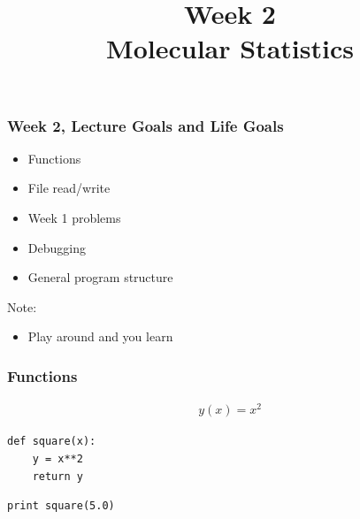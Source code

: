 

\usepackage{soul}

\title[]{Week 2\\Molecular Statistics}








{
\usebackgroundtemplate{}
\begin{frame}[plain]
    \titlepage
    \addtocounter{framenumber}{-1}
\end{frame}
}

\begin{frame}[fragile]

    \frametitle{Week 2, Lecture Goals and Life Goals}

    \begin{itemize}
        \item Functions
        \item File read/write
        \item Week 1 problems
        \item Debugging
        \item General program structure
    \end{itemize}

    \bigskip

    Note:
    \begin{itemize}

        \item Play around and you learn

    \end{itemize}

\end{frame}


\begin{frame}[fragile]

    \frametitle{Functions}

    \begin{align*}
        y(x) = x^2
    \end{align*}

    \bigskip
    \bigskip

\begin{lstlisting}
def square(x):
    y = x**2
    return y

\end{lstlisting}

\begin{lstlisting}
print square(5.0)

\end{lstlisting}



\end{frame}


